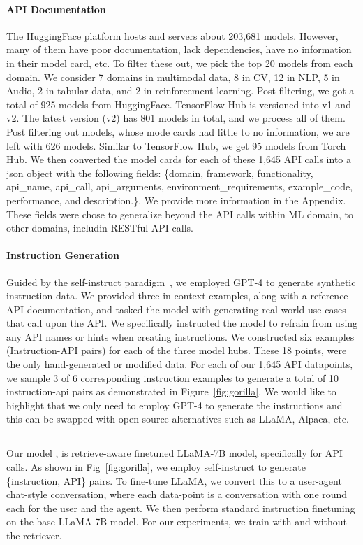 \paragraph{API Documentation} The HuggingFace platform hosts and servers about 203,681 models. However, many of them have poor documentation, lack dependencies, have no information in their model card, etc. To filter these out, we pick the top 20 models from each domain. 
We consider 7 domains in multimodal data, 8 in CV, 12 in NLP, 5 in Audio, 2 in tabular data, and 2 in  reinforcement learning. Post filtering, we got a total of 925 models from HuggingFace. TensorFlow Hub is versioned into v1 and v2. The latest version (v2) has 801 models in total, and we process all of them. Post filtering out models, whose mode cards had little to no information, we are left with 626 models. Similar to TensorFlow Hub, we get 95 models from Torch Hub. 
We then converted the model cards for each of these 1,645 API calls into a json object with the following fields: \{domain, framework, functionality, api\_name, api\_call, api\_arguments, environment\_requirements, example\_code, performance, and description.\}. We provide more information in the Appendix. These fields were chose to generalize beyond the API calls within ML domain, to other domains, includin RESTful API calls. 




\paragraph{Instruction Generation}
Guided by the self-instruct paradigm~\cite{wang2022self}, we employed GPT-4 to generate synthetic instruction data. 
We provided three in-context examples, along with a reference API documentation, and tasked the model with generating real-world use cases that call upon the API. We specifically instructed the model to refrain from using any API names or hints when creating instructions. We constructed six examples (Instruction-API pairs) for each of the three model hubs. These 18 points, were the only hand-generated or modified data. For each of our 1,645 API datapoints, we sample 3 of 6 corresponding instruction examples to generate a total of 10 instruction-api pairs as demonstrated in Figure~\ref{fig:gorilla}. We would like to highlight that we only need to employ GPT-4 to generate the instructions and this can be swapped  with open-source alternatives such as LLaMA, Alpaca, etc. 

\subsection{\gorilla{}}
Our model \oursmethod{}, is retrieve-aware finetuned LLaMA-7B model, specifically for API calls. As shown in Fig~\ref{fig:gorilla}, we employ self-instruct to generate \{instruction, API\} pairs. To fine-tune LLaMA, we convert this to a user-agent chat-style conversation, where each data-point is a conversation with one round each for the user and the agent. We then perform standard instruction finetuning on the base LLaMA-7B model. For our experiments, we train \gorilla{} with and without the retriever. 

